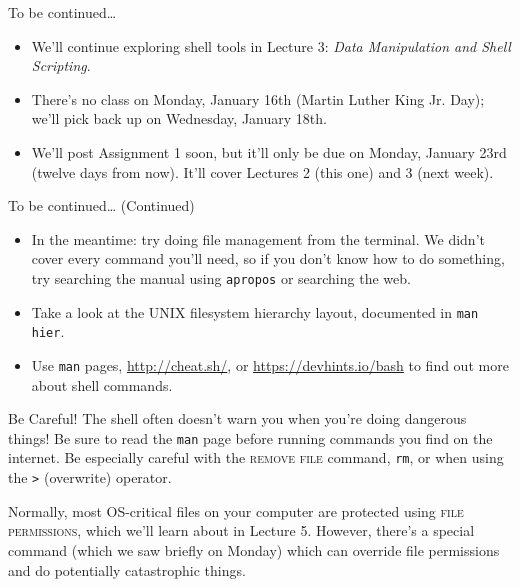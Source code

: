 \begin{frame}{To be continued\ldots}
  \begin{itemize}
    \item
      We'll continue exploring shell tools in Lecture 3: \textit{Data
      Manipulation and Shell Scripting}.
      \pause
    \item
      There's no class on Monday, January 16th (Martin Luther King Jr. Day);
      we'll pick back up on \alert<2>{Wednesday, January 18th}.
      \pause
    \item
      We'll post Assignment 1 soon, but it'll only be due on Monday, January
      23rd (twelve days from now).  It'll cover Lectures 2 (this one) and 3
      (next week).
  \end{itemize}
\end{frame}

\begin{frame}{To be continued\ldots{ }(Continued)}
  \begin{itemize}
    \item
      In the meantime: try doing file management from the terminal.  We didn't
      cover every command you'll need, so if you don't know how to do
      something, try searching the manual using \texttt{apropos} or searching
      the web.
      \pause
    \item
      Take a look at the UNIX filesystem hierarchy layout, documented in
      \texttt{man hier}. 
    \item
      Use \texttt{man} pages, \url{http://cheat.sh/}, or
      \url{https://devhints.io/bash} to find out more about shell commands.
  \end{itemize}
  \pause
  \begin{alertblock}{Be Careful!}
    The shell often doesn't warn you when you're doing dangerous things!  Be
    sure to read the \texttt{man} page before running commands you find on the
    internet.  Be especially careful with the \textsc{remove file} command,
    \texttt{rm}, or when using the \texttt{>} (overwrite) operator.
  \end{alertblock}
\end{frame}

Normally, most OS-critical files on your computer are protected using
\textsc{file permissions}, which we'll learn about in Lecture 5.  However,
there's a special command (which we saw briefly on Monday) which can override
file permissions and do potentially catastrophic things.

